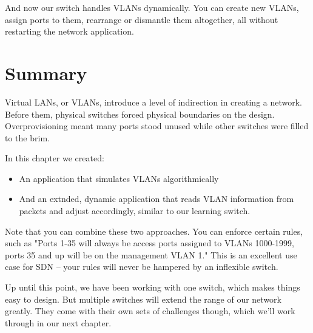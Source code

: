 \inputminted[firstline=49,lastline=54]{python}{code/handling_vlans/vlan2.py}

And now our switch handles VLANs dynamically.  You can create new VLANs, assign ports to them, rearrange or
dismantle them altogether, all without restarting the network application.  

\section{Summary}

Virtual LANs, or VLANs, introduce a level of indirection in creating a network.  Before them, physical
switches forced physical boundaries on the design.  Overprovisioning meant many ports stood unused while 
other switches were filled to the brim.  

In this chapter we created:

\begin{itemize}
\item An application that simulates VLANs algorithmically
\item And an extnded, dynamic application that reads VLAN information from packets and adjust accordingly, 
similar to our learning switch.
\end{itemize}

Note that you can combine these two approaches.  You can enforce certain rules, such as "Ports 1-35 will always
be access ports assigned to VLANs 1000-1999, ports 35 and up will be on the management VLAN 1."  This is an
excellent use case for SDN -- your rules will never be hampered by an inflexible switch.

Up until this point, we have been working with one switch, which makes things easy to design.  But multiple
switches will extend the range of our network greatly.  They come with their own sets of challenges though,
which we'll work through in our next chapter.  